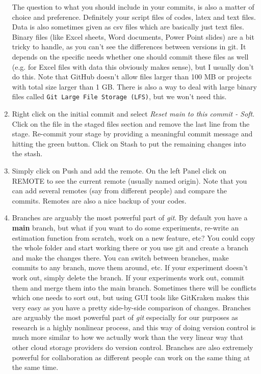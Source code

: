 \begin{enumerate}
	The question to what you should include in your commits,
	  is also a matter of choice and preference.
	Definitely your script files of codes, latex and text files.
	Data is also sometimes given as csv files which are basically just text files.
	Binary files (like Excel sheets, Word documents, Power Point slides) are a bit tricky to handle,
	  as you can't see the differences between versions in git.
	It depends on the specific needs whether one should commit these files as well (e.g. for Excel files with data this obviously makes sense),
	  but I usually don't do this.
	Note that GitHub doesn't allow files larger than 100 MB or projects with total size larger than 1 GB.
	There is also a way to deal with large binary files called \texttt{Git Large File Storage (LFS)}, but we won't need this.
\item Right click on the initial commit and select \emph{Reset main to this commit - Soft}.
Click on the file in the staged files section and remove the last line from the stage.
Re-commit your stage by providing a meaningful commit message and hitting the green button.
Click on Stash to put the remaining changes into the stash.
\item Simply click on Push and add the remote. On the left Panel click on REMOTE to see the current remote (usually named origin).
Note that you can add several remotes (say from different people) and compare the commits.
Remotes are also a nice backup of your codes.
\item Branches are arguably the most powerful part of \emph{git}.
By default you have a \textbf{main} branch,
  but what if you want to do some experiments, re-write an estimation function from scratch, work on a new feature, etc?
You could copy the whole folder and start working there or you use git and create a branch and make the changes there.
You can switch between branches, make commits to any branch, move them around, etc.
If your experiment doesn't work out, simply delete the branch.
If your experiments work out, commit them and merge them into the main branch.
Sometimes there will be conflicts which one needs to sort out,
  but using GUI tools like GitKraken makes this very easy
  as you have a pretty side-by-side comparison of changes.
Branches are arguably the most powerful part of \emph{git} especially for our purposes
  as research is a highly nonlinear process, and this way of doing version control is much more similar to how we actually work
  than the very linear way that other cloud storage providers do version control.
Branches are also extremely powerful for collaboration
  as different people can work on the same thing at the same time.


\end{enumerate}
